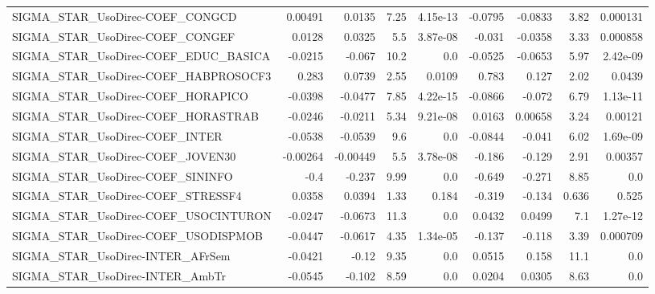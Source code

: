 \begin{tabular}{lrrrrrrrr}
SIGMA\_STAR\_UsoDirec-COEF\_CONGCD        &     0.00491 &       0.0135 &    7.25 & 4.15e-13 &    -0.0795 &     -0.0833 &         3.82 &      0.000131 \\
SIGMA\_STAR\_UsoDirec-COEF\_CONGEF        &      0.0128 &       0.0325 &     5.5 & 3.87e-08 &     -0.031 &     -0.0358 &         3.33 &      0.000858 \\
SIGMA\_STAR\_UsoDirec-COEF\_EDUC\_BASICA   &     -0.0215 &       -0.067 &    10.2 &      0.0 &    -0.0525 &     -0.0653 &         5.97 &      2.42e-09 \\
SIGMA\_STAR\_UsoDirec-COEF\_HABPROSOCF3   &       0.283 &       0.0739 &    2.55 &   0.0109 &      0.783 &       0.127 &         2.02 &        0.0439 \\
SIGMA\_STAR\_UsoDirec-COEF\_HORAPICO      &     -0.0398 &      -0.0477 &    7.85 & 4.22e-15 &    -0.0866 &      -0.072 &         6.79 &      1.13e-11 \\
SIGMA\_STAR\_UsoDirec-COEF\_HORASTRAB     &     -0.0246 &      -0.0211 &    5.34 & 9.21e-08 &     0.0163 &     0.00658 &         3.24 &       0.00121 \\
SIGMA\_STAR\_UsoDirec-COEF\_INTER         &     -0.0538 &      -0.0539 &     9.6 &      0.0 &    -0.0844 &      -0.041 &         6.02 &      1.69e-09 \\
SIGMA\_STAR\_UsoDirec-COEF\_JOVEN30       &    -0.00264 &     -0.00449 &     5.5 & 3.78e-08 &     -0.186 &      -0.129 &         2.91 &       0.00357 \\
SIGMA\_STAR\_UsoDirec-COEF\_SININFO       &        -0.4 &       -0.237 &    9.99 &      0.0 &     -0.649 &      -0.271 &         8.85 &           0.0 \\
SIGMA\_STAR\_UsoDirec-COEF\_STRESSF4      &      0.0358 &       0.0394 &    1.33 &    0.184 &     -0.319 &      -0.134 &        0.636 &         0.525 \\
SIGMA\_STAR\_UsoDirec-COEF\_USOCINTURON   &     -0.0247 &      -0.0673 &    11.3 &      0.0 &     0.0432 &      0.0499 &          7.1 &      1.27e-12 \\
SIGMA\_STAR\_UsoDirec-COEF\_USODISPMOB    &     -0.0447 &      -0.0617 &    4.35 & 1.34e-05 &     -0.137 &      -0.118 &         3.39 &      0.000709 \\
SIGMA\_STAR\_UsoDirec-INTER\_AFrSem       &     -0.0421 &        -0.12 &    9.35 &      0.0 &     0.0515 &       0.158 &         11.1 &           0.0 \\
SIGMA\_STAR\_UsoDirec-INTER\_AmbTr        &     -0.0545 &       -0.102 &    8.59 &      0.0 &     0.0204 &      0.0305 &         8.63 &           0.0 \\

\end{tabular}
